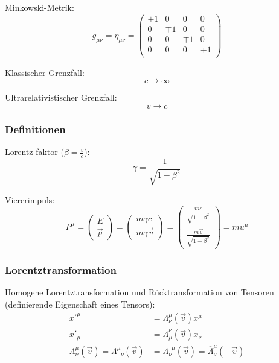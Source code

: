 \documentclass[11pt]{article}
\numberwithin{equation}{section}
\begin{document}
			\noindent
			Minkowski-Metrik:
			\begin{equation}
				g_{\mu\nu} = \eta_{\mu\nu}
				= \left( \begin{matrix}
					\pm1 & 0		& 0		& 0		\\
					0		& \mp1 & 0		& 0		\\
					0		& 0		& \mp1 & 0		\\
					0		& 0		& 0		& \mp1 \\
				\end{matrix} \right)
			\end{equation}

			\noindent
			Klassischer Grenzfall:
			\begin{equation}
				c \rightarrow \infty
			\end{equation}

			\noindent
			Ultrarelativistischer Grenzfall:
			\begin{equation}
				v\rightarrow c
			\end{equation}

			\subsubsection{Definitionen}
				\noindent
				Lorentz-faktor ($\beta = \frac{v}{c}$):
				\begin{equation}
					\gamma = \frac{1}{\sqrt{1-\beta^2}}
				\end{equation}

				\noindent
				Viererimpuls:
				\begin{equation}
					P^\mu =
					\left(\begin{matrix}
						E \\ \vec{p}
					\end{matrix}\right)
					= \left(\begin{matrix}
						m\gamma c \\ m\gamma\vec{v}
					\end{matrix}\right)
					= \left(\begin{matrix}
						\frac{mc}{\sqrt{1-\beta^2}} \\ \frac{m\vec{v}}{\sqrt{1-\beta^2}}
					\end{matrix}\right)
					= m u^\mu
				\end{equation}

			\subsubsection{Lorentztransformation}
				\noindent
				Homogene Lorentztransformation und Rücktransformation von Tensoren (definierende Eigenschaft eines Tensors):
				\begin{equation}
					\begin{aligned}
						x'^\mu &=					\Lambda^{\mu}_{\nu}(\vec{v}) x^\mu \\
						x'_\mu &= \overline{\Lambda}_\mu^{\nu}(\vec{v}) x_\nu \\
						\Lambda^{\mu}_{\nu}(\vec{v}) = \Lambda^{\mu}_{\phantom{\mu}\nu}(\vec{v}) &= \Lambda^{\phantom{\nu}\mu}_{\nu}(\vec{v}) = \overline{\Lambda}^{\mu}_{\nu}(-\vec{v})
					\end{aligned}
				\end{equation}
\end{document}
